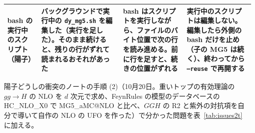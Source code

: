 \documentclass[a4paper,10pt]{ltjsarticle}
\makeatletter
\newcommand{\MGaMC}{MG5\_aMC@NLO}
\makeatother
\begin{document}
\begin{table}[tbp]
\begin{tabularx}{\linewidth}{>{\raggedright\arraybackslash}p{2.4cm}>{\raggedright\arraybackslash}X>{\raggedright\arraybackslash}X>{\raggedright\arraybackslash}X}
bash の実行中のスクリプト（陽子） & バックグラウンドで実行中の \texttt{dy\_mg5.sh} を編集した（実行を足した）。そのまま続けると、残りの行がずれて読まれるおそれがあった & bash はスクリプトを実行しながら、ファイルのバイト位置で次の行を読み進める。前に行を足すと、続きの位置がずれる & 実行中のスクリプトは編集しない。編集したら外側の bash だけを止め（子の MG5 は続く）、終わってから \texttt{--reuse} で再開する \\
\bottomrule
\end{tabularx}
\end{table}

陽子どうしの衝突のノートの手順 (2)（10月20日。重いトップの有効理論の $gg\to H$ の NLO を $d$ 次元で求め、FeynRules の模型のデータベースの HC\_NLO\_X0 で \MGaMC{} と比べ、$GGH$ の R2 と紫外の対抗項を自分で導いて自作の NLO の UFO を作った）で分かった問題を表~\ref{tab:issues2t} に加える。
\end{document}
